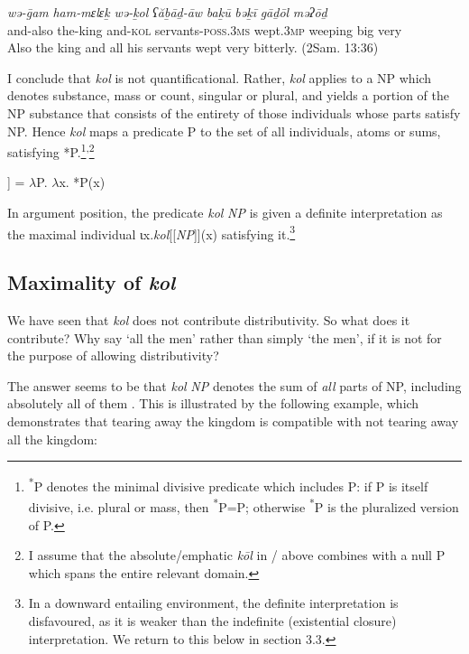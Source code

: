 \documentclass[output=paper]{langsci/langscibook}
\begin{document}
\ea%
    \label{ex:doron:21}
    \gll \textit{wə-ḡam}   \textit{ham-mɛlɛḵ}  \textit{wə-ḵol}     \textit{ʕăḇāḏ-āw}                  \textit{baḵū}          \textit{bəḵī}         \textit{gāḏōl} \textit{məʔōḏ}\\
         and-also  the-king      and-\textsc{kol} servants-\textsc{poss.3ms}  wept.\textsc{3mp}   weeping  big      very\\
    \glt Also the king and all his servants wept very bitterly. (2Sam. 13:36)
\z



I conclude that \textit{kol} is not quantificational. Rather, \textit{kol} applies to a NP which denotes substance, mass or count, singular or plural, and yields a portion of the NP substance that consists of the entirety of those individuals whose parts satisfy NP. Hence \textit{kol} maps a predicate P to the set of all individuals, atoms or sums, satisfying *P.\footnote{\textrm{\textsuperscript{*}}\textrm{P denotes the minimal divisive predicate \citep{Krifka1989} which includes P: if P is itself divisive, i.e. plural or mass, then} \textrm{\textsuperscript{*}}\textrm{P=P; otherwise} \textrm{\textsuperscript{*}}\textrm{P is the pluralized version of P.}}\textsuperscript{,}\footnote{\textrm{I assume that the absolute/emphatic} \textrm{\textit{kōl} }\textrm{in / above combines with a null P which spans the entire relevant domain.}}

\ea%
    \label{ex:doron:22}\relax
    [[kol]] =  ${\lambda}$P. ${\lambda}$x. *P(x)
    \z

In argument position, the predicate \textit{kol} \textit{NP} is given a definite interpretation as the maximal individual ιx.\textit{kol}[[\textit{NP}]](x) satisfying it.\footnote{\textrm{In a downward entailing environment, the definite interpretation is disfavoured, as it is weaker than the indefinite (existential closure) interpretation. We return to this below in section 3.3.}}

\subsection{Maximality of \textit{kol}}\label{sec:doron:3.2}%

We have seen that \textit{kol} does not contribute distributivity. So what does it contribute? Why say ‘all the men’ rather than simply ‘the men’, if it is not for the purpose of allowing distributivity?

The answer seems to be that \textit{kol} \textit{NP} denotes the sum of \textit{all} parts of NP, including absolutely all of them \citet{Brisson1997,Brisson2003}. This is illustrated by the following example, which demonstrates that tearing away the kingdom is compatible with not tearing away all the kingdom:
\end{document}
